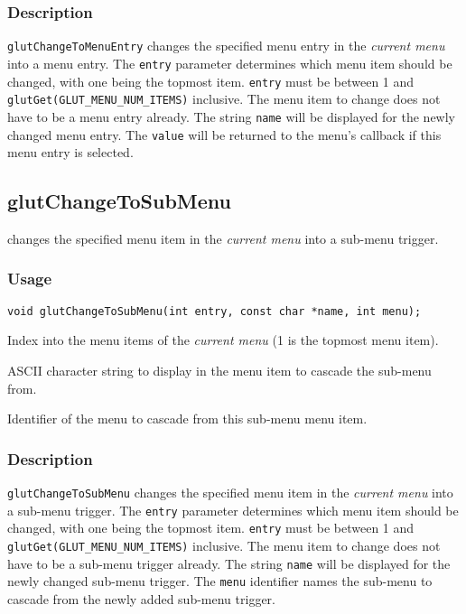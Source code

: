 \subsubsection*{Description}

{\tt glutChangeToMenuEntry} changes the specified menu entry in the {\em current
menu} into a menu entry.  The {\tt entry} parameter determines which menu
item should be changed, with one being the topmost item.  
{\tt entry} must be between 1 and {\tt glutGet(GLUT\_MENU\_NUM\_ITEMS)}
inclusive.
The menu item to
change does not have to be a menu entry already.  The string {\tt name}
will be displayed for the newly changed menu entry.  The {\tt value}
will be returned to the menu's callback if this menu entry is selected.

\subsection{glutChangeToSubMenu}

 changes the specified menu item in the {\em
current menu} into a sub-menu trigger.

\subsubsection*{Usage}
\begin{verbatim}
void glutChangeToSubMenu(int entry, const char *name, int menu);
\end{verbatim}
\begin{description}
\itemsep 0in
\item[{\tt entry}]
Index into the menu items of the {\em current menu} (1 is the topmost
menu item).
\item[{\tt name}]
ASCII character string to display in the menu item to cascade the sub-menu from.
\item[{\tt menu}]
Identifier of the menu to cascade from this sub-menu menu item.
\end{description}

\subsubsection*{Description}

{\tt glutChangeToSubMenu} changes the specified menu item in the {\em
current menu} into a sub-menu trigger.  The {\tt entry} parameter
determines which menu item should be changed, with one being the
topmost item.  
{\tt entry} must be between 1 and {\tt glutGet(GLUT\_MENU\_NUM\_ITEMS)}
inclusive.
The menu item to change does not have to be a sub-menu
trigger already.  The string {\tt name}
will be displayed for the newly changed sub-menu trigger.
The {\tt menu} identifier names the sub-menu to cascade from the
newly added sub-menu trigger.


